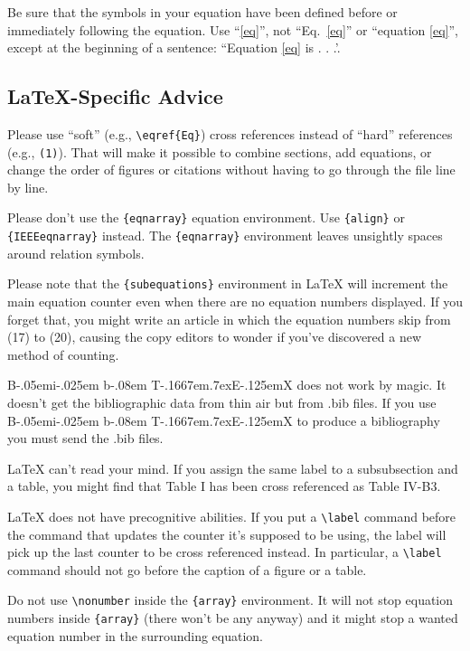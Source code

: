 \documentclass[conference]{IEEEtran}
\def\BibTeX{{\rm B\kern-.05em{\sc i\kern-.025em b}\kern-.08em
    T\kern-.1667em\lower.7ex\hbox{E}\kern-.125emX}}
\begin{document}
Be sure that the 
symbols in your equation have been defined before or immediately following 
the equation. Use ``\eqref{eq}'', not ``Eq.~\eqref{eq}'' or ``equation \eqref{eq}'', except at 
the beginning of a sentence: ``Equation \eqref{eq} is . . .'.

\subsection{\LaTeX-Specific Advice}

Please use ``soft'' (e.g., \verb|\eqref{Eq}|) cross references instead
of ``hard'' references (e.g., \verb|(1)|). That will make it possible
to combine sections, add equations, or change the order of figures or
citations without having to go through the file line by line.

Please don't use the \verb|{eqnarray}| equation environment. Use
\verb|{align}| or \verb|{IEEEeqnarray}| instead. The \verb|{eqnarray}|
environment leaves unsightly spaces around relation symbols.

Please note that the \verb|{subequations}| environment in {\LaTeX}
will increment the main equation counter even when there are no
equation numbers displayed. If you forget that, you might write an
article in which the equation numbers skip from (17) to (20), causing
the copy editors to wonder if you've discovered a new method of
counting.

{\BibTeX} does not work by magic. It doesn't get the bibliographic
data from thin air but from .bib files. If you use {\BibTeX} to produce a
bibliography you must send the .bib files. 

{\LaTeX} can't read your mind. If you assign the same label to a
subsubsection and a table, you might find that Table I has been cross
referenced as Table IV-B3. 

{\LaTeX} does not have precognitive abilities. If you put a
\verb|\label| command before the command that updates the counter it's
supposed to be using, the label will pick up the last counter to be
cross referenced instead. In particular, a \verb|\label| command
should not go before the caption of a figure or a table.

Do not use \verb|\nonumber| inside the \verb|{array}| environment. It
will not stop equation numbers inside \verb|{array}| (there won't be
any anyway) and it might stop a wanted equation number in the
surrounding equation.
\end{document}
